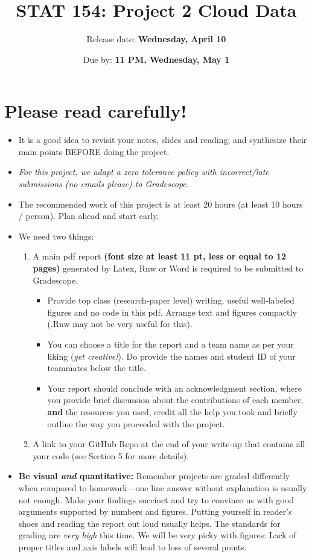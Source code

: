\documentclass[11pt]{article}\usepackage[]{graphicx}\usepackage[]{color}
\title{STAT 154: Project 2 Cloud Data}
\author{Release date: \textbf{Wednesday, April 10}}
\date{Due by: \textbf{11 PM, Wednesday, May 1}}
\begin{document}
\maketitle

\section*{Please read carefully!}
\begin{itemize}
  \item It is a good idea to revisit your notes, slides and reading;
and synthesize their main points BEFORE doing the project.
  \item \emph{For this project, we adapt a zero tolerance policy with 
  incorrect/late submissions (no emails please) to Gradescope.}
  \item The recommended work of this project is at least 20 hours (at least 10 hours / person). Plan ahead and start early. 
  \item We need two things:
  \begin{enumerate}[label=(\alph*)]
    \item A main pdf report \textbf{(font size at least 11 pt, less or equal
    to 12 pages)} generated by Latex, Rnw or Word is required to be
    submitted to Gradescope.
    \begin{itemize}
      \item Provide top class (research-paper level) writing, useful
    well-labeled figures and no code in this pdf. Arrange text and figures
    compactly (.Rnw may not be very useful for this).
    \item You can choose a title for the report and a team name as per your
    liking (\emph{get creative!}). Do provide the names and student ID of
    your teammates below the title.
    \item Your report should conclude with an acknowledgment section, where
    you provide brief discussion about the contributions of each member,
    \textbf{and} the resources you used, credit all the help you took
    and briefly outline the way you proceeded with the project.
    \end{itemize}
    \item A link to your GitHub Repo at the end of your write-up that contains
    all your code (see Section 5 for more details).
  \end{enumerate}
  \item \textbf{Be visual \emph{and} quantitative:} Remember projects are graded differently when compared to homework---one line answer without explanation is usually not enough. Make your findings succinct and try to convince us with good arguments supported by numbers and figures.
Putting yourself in reader's shoes and reading the report out loud usually helps. The standards for grading are \emph{very high} this time. We will be very picky with figures: Lack of proper titles and axis labels will lead to loss of several points.
  
\end{itemize}
\end{document}
